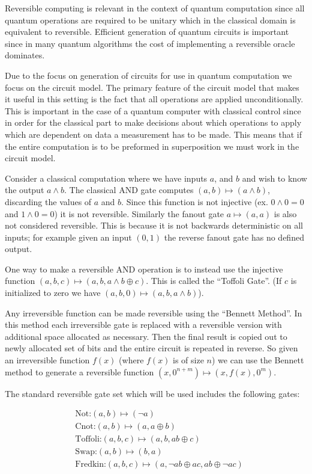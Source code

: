 Reversible computing is relevant in the context of quantum computation since
all quantum operations are required to be unitary which in the classical domain
is equivalent to reversible. Efficient generation of quantum circuits is
important since in many quantum algorithms the cost of implementing a
reversible oracle dominates.

Due to the focus on generation of circuits for use in quantum computation we
focus on the circuit model. The primary feature of the circuit model that makes
it useful in this setting is the fact that all operations are applied
unconditionally. This is important in the case of a quantum computer with
classical control since in order for  the classical part to make decisions
about which operations to apply which are dependent on data a measurement has
to be made.  This means that if the entire computation is to be preformed in
superposition we must work in the circuit model.

Consider a classical computation where we have inputs $a$, and $b$ and wish to
know the output $a\land b$.  The classical AND gate computes $(a,b)\mapsto
(a\land b)$, discarding the values of $a$ and $b$.   Since this function is not
injective (ex. $0\land 0 = 0$ and $1 \land 0 = 0$) it is not reversible.
Similarly the fanout gate $a\mapsto (a,a)$ is also not considered reversible.
This is because it is not backwards deterministic on all inputs; for example
given an input $(0,1)$ the reverse fanout gate has no defined output. 

One way to make a reversible AND operation is to instead use the injective function
$(a,b,c) \mapsto (a,b,a\land b \oplus c)$. This is called the ``Toffoli Gate''.
(If $c$ is initialized to zero we have $(a,b,0) \mapsto (a,b,a\land b)$).

Any irreversible function can be made reversible using the ``Bennett
Method''\cite{Bennett:73}. In this method each irreversible gate is replaced
with a reversible version with additional space allocated as necessary. Then the
final result is copied out to newly allocated set of bits and the entire circuit
is repeated in reverse. So given an irreversible function $f(x)$ (where $f(x)$
is of size $n$) we can use the Bennett method to generate a reversible function
$(x,0^{n+m}) \mapsto (x,f(x),0^m)$.

The standard reversible gate set which will be used includes the following gates:

\begin{align*}
	&\text{Not:} (a,b) \mapsto (\neg a) \\
	&\text{Cnot:} (a,b) \mapsto (a,a\oplus b) \\
        &\text{Toffoli:} (a,b,c) \mapsto (a,b,ab\oplus c) \\
	&\text{Swap:} (a,b) \mapsto (b,a) \\
	&\text{Fredkin:} (a,b,c) \mapsto (a,\neg a b \oplus ac, ab\oplus \neg a c)
\end{align*}

